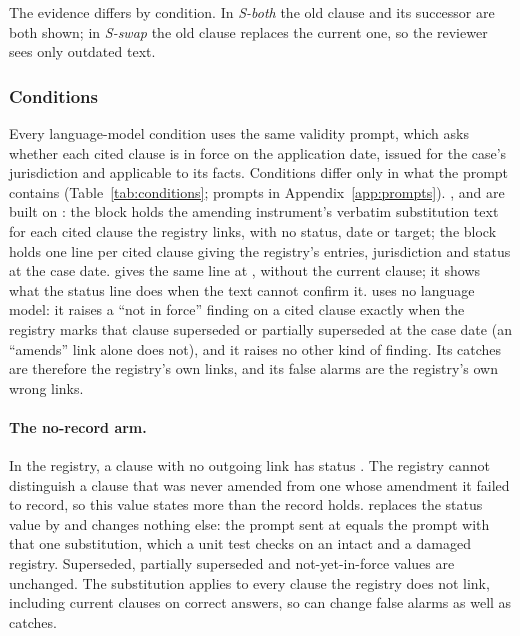 The evidence differs by condition. In \emph{S-both} the old clause and its successor are both shown; in \emph{S-swap}
the old clause replaces the current one, so the reviewer sees only outdated text.

\subsubsection{Conditions}
\label{sec:conditions}
Every language-model condition uses the same validity prompt, which asks whether each cited clause is in force on the
application date, issued for the case's jurisdiction and applicable to its facts. Conditions differ only in what the
prompt contains (Table~\ref{tab:conditions}; prompts in Appendix~\ref{app:prompts}). ,  and 
are built on : the  block holds the amending instrument's verbatim substitution text for each cited
clause the registry links, with no status, date or target; the  block holds one line per cited clause giving
the registry's entries, jurisdiction and status at the case date. \Rfourp{} gives the same line at , without
the current clause; it shows what the status line does when the text cannot confirm it.  uses no language
model: it raises a ``not in force'' finding on a cited clause exactly when the registry marks that clause superseded or
partially superseded at the case date (an ``amends'' link alone does not), and it raises no other kind of finding. Its
catches are therefore the registry's own links, and its false alarms are the registry's own wrong links.

\paragraph{The no-record arm.}
In the registry, a clause with no outgoing link has status . The registry cannot distinguish a clause
that was never amended from one whose amendment it failed to record, so this value states more than the record holds.
 replaces the status value  by  and changes nothing else: the
prompt sent at  equals the  prompt with that one substitution, which a unit test checks on an
intact and a damaged registry. Superseded, partially superseded and not-yet-in-force values are unchanged. The substitution applies to every clause
the registry does not link, including current clauses on correct answers, so  can change false alarms as well as
catches.

